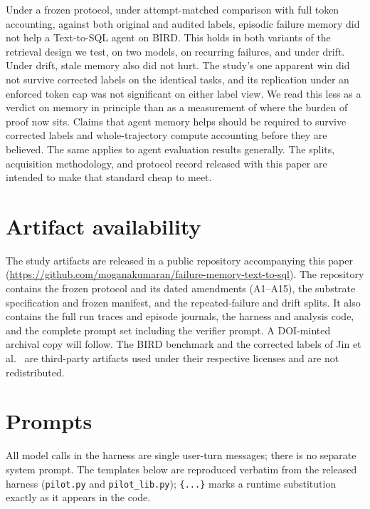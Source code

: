 \documentclass[sigconf, nonacm]{acmart}
\begin{document}
Under a frozen protocol, under attempt-matched comparison with full token accounting, against both original and audited labels, episodic failure memory did not help a Text-to-SQL agent on BIRD. This holds in both variants of the retrieval design we test, on two models, on recurring failures, and under drift. Under drift, stale memory also did not hurt. The study's one apparent win did not survive corrected labels on the identical tasks, and its replication under an enforced token cap was not significant on either label view. We read this less as a verdict on memory in principle than as a measurement of where the burden of proof now sits. Claims that agent memory helps should be required to survive corrected labels and whole-trajectory compute accounting before they are believed. The same applies to agent evaluation results generally. The splits, acquisition methodology, and protocol record released with this paper are intended to make that standard cheap to meet.

\section*{Artifact availability}

The study artifacts are released in a public repository accompanying this paper (\url{https://github.com/moganakumaran/failure-memory-text-to-sql}). The repository contains the frozen protocol and its dated amendments (A1--A15), the substrate specification and frozen manifest, and the repeated-failure and drift splits. It also contains the full run traces and episode journals, the harness and analysis code, and the complete prompt set including the verifier prompt. A DOI-minted archival copy will follow. The BIRD benchmark and the corrected labels of Jin et al.~\cite{jin} are third-party artifacts used under their respective licenses and are not redistributed.




\appendix
\section{Prompts}

All model calls in the harness are single user-turn messages; there is no separate system prompt. The templates below are reproduced verbatim from the released harness (\texttt{pilot.py} and \texttt{pilot\_lib.py}); \texttt{\{...\}} marks a runtime substitution exactly as it appears in the code.
\end{document}
